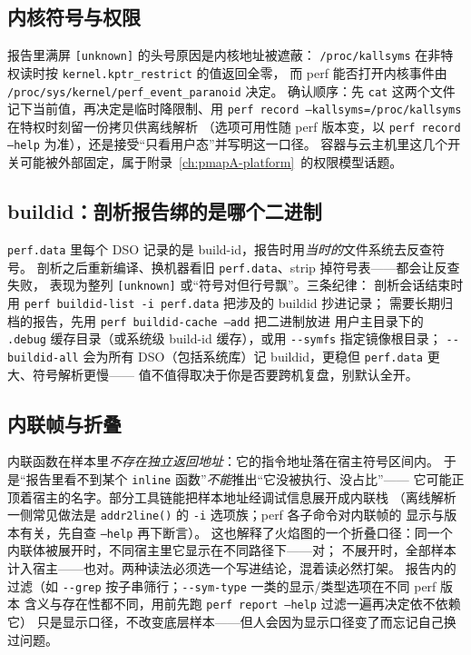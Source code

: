 \documentclass[12pt,a4paper,fontset=fandol]{ctexbook}
\newcommand{\Fn}[1]{\texttt{#1()}}
\newcommand{\Tp}[1]{\texttt{#1}}
\newcommand{\Opt}[1]{\texttt{-\/-#1}}
\newcommand{\Bk}{\discretionary{}{}{}}
\begin{document}
\subsection{内核符号与权限}

报告里满屏 \Tp{[unknown]} 的头号原因是内核地址被遮蔽：
\Tp{/proc/kallsyms} 在非特权读时按 \Tp{kernel.kptr{\Bk}\_restrict} 的值返回全零，
而 perf 能否打开内核事件由 \Tp{/proc/sys/kernel/perf{\Bk}\_event{\Bk}\_paranoid} 决定。
确认顺序：先 \Tp{cat} 这两个文件记下当前值，再决定是临时降限制、用
\Tp{perf record --kallsyms=/proc/kallsyms} 在特权时刻留一份拷贝供离线解析
（选项可用性随 perf 版本变，以 \Tp{perf record --help} 为准），还是接受``只看用户态''并写明这一口径。
容器与云主机里这几个开关可能被外部固定，属于附录~\ref{ch:pmapA-platform}~的权限模型话题。

\subsection{buildid：剖析报告绑的是哪个二进制}

\Tp{perf.data} 里每个 DSO 记录的是 build-id，报告时用\emph{当时的}文件系统去反查符号。
剖析之后重新编译、换机器看旧 \Tp{perf.data}、strip 掉符号表——都会让反查失败，
表现为整列 \Tp{[unknown]} 或``符号对但行号飘''。三条纪律：
剖析会话结束时用 \Tp{perf buildid-list -i perf.data} 把涉及的 buildid 抄进记录；
需要长期归档的报告，先用 \Tp{perf buildid-cache --add} 把二进制放进
用户主目录下的 \Tp{.debug} 缓存目录（或系统级 build-id 缓存），或用 \Opt{symfs} 指定镜像根目录；
\Opt{buildid-all} 会为所有 DSO（包括系统库）记 buildid，更稳但 \Tp{perf.data} 更大、符号解析更慢——
值不值得取决于你是否要跨机复盘，别默认全开。

\subsection{内联帧与折叠}

内联函数在样本里\emph{不存在独立返回地址}：它的指令地址落在宿主符号区间内。
于是``报告里看不到某个 \Tp{inline} 函数''\emph{不能}推出``它没被执行、没占比''——
它可能正顶着宿主的名字。部分工具链能把样本地址经调试信息展开成内联栈
（离线解析一侧常见做法是 \Fn{addr2line} 的 \Tp{-i} 选项族；perf 各子命令对内联帧的
显示与版本有关，先自查 \Tp{--help} 再下断言）。
这也解释了火焰图的一个折叠口径：同一个内联体被展开时，不同宿主里它显示在不同路径下——对；
不展开时，全部样本计入宿主——也对。两种读法必须选一个写进结论，混着读必然打架。
报告内的过滤（如 \Opt{grep} 按子串筛行；\Opt{sym-type} 一类的显示/类型选项在不同 perf 版本
含义与存在性都不同，用前先跑 \Tp{perf report --help} 过滤一遍再决定依不依赖它）
只是显示口径，不改变底层样本——但人会因为显示口径变了而忘记自己换过问题。
\end{document}
